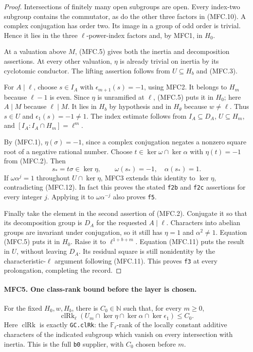\documentclass[11pt,a4paper]{article}
\numberwithin{equation}{section}
\theoremstyle{remark}\newtheorem{remark}[theorem]{Remark}
\begin{document}
\begin{proof}
Intersections of finitely many open subgroups are open.
Every index-two subgroup contains the commutator, as do the other
three factors in (MFC.10).  A complex conjugation has order two.
Its image in a group of odd order is trivial.  Hence it lies in
the three \(\ell\)-power-index factors and, by MFC1, in \(H_0\).

At a valuation above \(M\), (MFC.5) gives both the inertia and
decomposition assertions.  At every other valuation, \(\eta\)
is already trivial on inertia by its cyclotomic conductor.
The lifting assertion follows from \(U\subseteq H_b\) and
(MFC.3).

For \(A\mid\ell\), choose \(s\in I_A\) with
\(\epsilon_{m+1}(s)=-1\), using MFC2.  It belongs to \(H_m\)
because \(\ell-1\) is even.  Since \(\eta\) is unramified
at \(\ell\), (MFC.5) puts it in \(H_0\); here \(A\mid M\)
because \(\ell\mid M\).  It lies in \(H_b\) by hypothesis
and in \(H_\theta\) because \(w\ne\ell\).  Thus \(s\in U\)
and \(\epsilon_1(s)=-1\ne1\).  The index estimate follows
from \(I_A\subseteq D_A\), \(U\subseteq H_m\), and
\([I_A:I_A\cap H_m]=\ell^m\).

By (MFC.1), \(\eta(\sigma)=-1\), since a complex conjugation
negates a nonzero square root of a negative rational number.
Choose \(t\in\ker\omega\cap\ker\alpha\) with
\(\eta(t)=-1\) from (MFC.2).  Then
\[
 s_*=t\sigma\in\ker\eta,\qquad
                  \omega(s_*)=-1,\quad\alpha(s_*)=1.       \tag{MFC.12}
\]
If \(\omega\alpha^j=1\) throughout \(U\cap\ker\eta\),
MFC3 extends this identity to \(\ker\eta\), contradicting
(MFC.12).  In fact this proves the stated \texttt{f2b} and
\texttt{f2c} assertions for every integer \(j\).  Applying it
to \(\omega\alpha^{-j}\) also proves \texttt{f5}.

Finally take the element in the second assertion of (MFC.2).
Conjugate it so that its decomposition group is \(D_A\) for
the requested \(A\mid\ell\).  Characters into abelian groups
are invariant under conjugation, so it still has \(\eta=1\)
and \(\alpha^2\ne1\).  Equation (MFC.5) puts it in \(H_0\).
Raise it to \(\ell^{1+b+m}\).  Equation (MFC.11) puts the
result in \(U\), without leaving \(D_A\).  Its residual
square is still nonidentity by the characteristic-\(\ell\)
argument following (MFC.11).  This proves \texttt{f3} at every
prolongation, completing the record.
\end{proof}

\paragraph{MFC5. One class-rank bound before the layer is chosen.}
\label{claim:MFC5}
For the fixed \(H_0,w,H_b\), there is \(C_0\in\mathbb N\)
such that, for every \(m\ge0\),
\[
 \operatorname{clRk}_\ell
  (U_m\cap\ker\eta\cap\ker\alpha\cap\ker\epsilon_1)
                         \le C_0.                         \tag{MFC.13}
\]
Here \(\operatorname{clRk}\) is exactly \texttt{GC.\allowbreak cl\allowbreak Rk}:
the \(\mathbb F_\ell\)-rank of the locally constant additive
characters of the indicated subgroup which vanish on every
intersection with inertia.  This is the full \texttt{b0}
supplier, with \(C_0\) chosen before \(m\).
\end{document}
